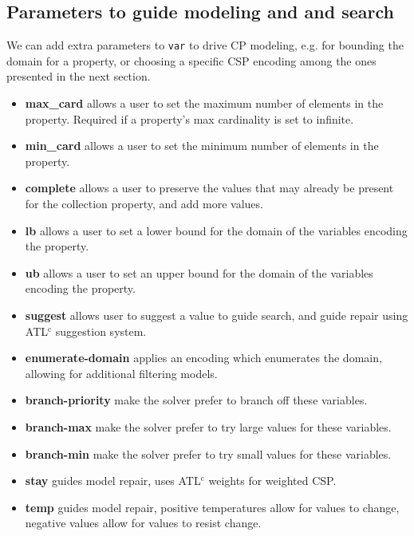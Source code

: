 \subsection{Parameters to guide modeling and and search}
We can add extra parameters to \texttt{var} to drive CP modeling, e.g. for bounding the domain for a property, or choosing a specific CSP encoding among the ones presented in the next section. 
\begin{itemize}
    \item \textbf{max\_card} allows a user to set the maximum number of elements in the property. Required if a property's max cardinality is set to infinite.
    \item \textbf{min\_card} allows a user to set the minimum number of elements in the property.
    \item \textbf{complete} allows a user to preserve the values that may already be present for the collection property, and add more values.
    \item \textbf{lb} allows a user to set a lower bound for the domain of the variables encoding the property.
    \item \textbf{ub} allows a user to set an upper bound for the domain of the variables encoding the property.
    \item \textbf{suggest} allows user to suggest a value to guide search, and guide repair using ATL$^{\text{c}}$ suggestion system.
    \item \textbf{enumerate-domain} applies an encoding which enumerates the domain, allowing for additional filtering models.
    \item \textbf{branch-priority} make the solver prefer to branch off these variables.
    \item \textbf{branch-max} make the solver prefer to try large values for these variables.
    \item \textbf{branch-min} make the solver prefer to try small values for these variables.
    \item \textbf{stay} guides model repair, uses ATL$^{\text{c}}$ weights for weighted CSP.
    \item \textbf{temp} guides model repair, positive temperatures allow for values to change, negative values allow for values to resist change.
\end{itemize}

